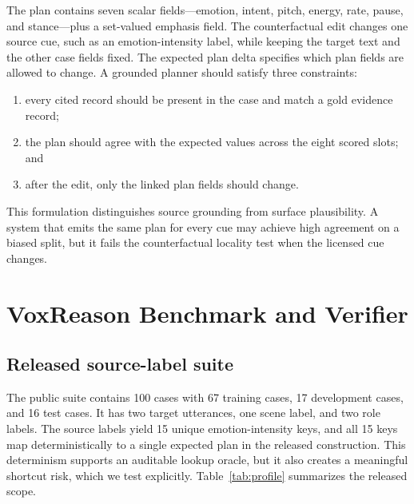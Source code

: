 \documentclass{article}
\begin{document}
The plan contains seven scalar fields---emotion, intent, pitch, energy, rate, pause, and stance---plus a set-valued emphasis field. The counterfactual edit changes one source cue, such as an emotion-intensity label, while keeping the target text and the other case fields fixed. The expected plan delta specifies which plan fields are allowed to change. A grounded planner should satisfy three constraints:

\begin{enumerate}
  \item every cited record should be present in the case and match a gold evidence record;
  \item the plan should agree with the expected values across the eight scored slots; and
  \item after the edit, only the linked plan fields should change.
\end{enumerate}

This formulation distinguishes source grounding from surface plausibility. A system that emits the same plan for every cue may achieve high agreement on a biased split, but it fails the counterfactual locality test when the licensed cue changes.

\section{VoxReason Benchmark and Verifier}

\subsection{Released source-label suite}

The public suite contains 100 cases with 67 training cases, 17 development cases, and 16 test cases. It has two target utterances, one scene label, and two role labels. The source labels yield 15 unique emotion-intensity keys, and all 15 keys map deterministically to a single expected plan in the released construction. This determinism supports an auditable lookup oracle, but it also creates a meaningful shortcut risk, which we test explicitly. Table~\ref{tab:profile} summarizes the released scope.
\end{document}
